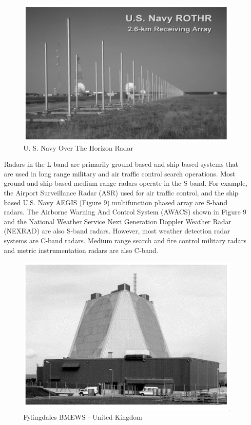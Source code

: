 \documentclass[14pt]{article} %
\begin{document}
 \begin{figure}[H]
  \includegraphics[width=\linewidth]{Horizonradar.png}
  \caption{U. S. Navy Over The Horizon Radar}
  \label{fig:figure 6}
\end{figure}
Radars in the L-band are primarily ground based and ship based systems that are used in long range military and air traffic control search operations. Most ground and ship based medium range radars operate in the S-band. For example, the Airport Surveillance Radar (ASR) used for air traffic control, and the ship based U.S. Navy AEGIS (Figure 9) multifunction phased array are S-band radars. The Airborne Warning And Control System (AWACS) shown in Figure 9 and the National Weather Service Next Generation Doppler Weather Radar (NEXRAD) are also S-band radars. However, most weather detection radar systems are C-band radars. Medium range search and fire control military radars and metric instrumentation radars are also C-band.
 \begin{figure}[H]
   \includegraphics[width=\linewidth]{fylingdales.png}
  \caption{Fylingdales BMEWS - United Kingdom}
  \label{fig:figure 7}
\end{figure}
\end{document}
